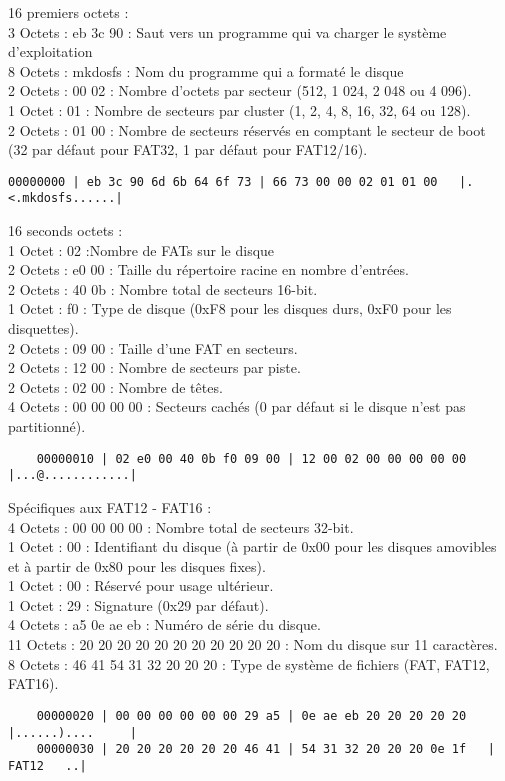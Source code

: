 \documentclass[11pt]{report}
\begin{document}
16 premiers octets : \\
3 Octets : eb 3c 90 : Saut vers un programme qui va charger le système d'exploitation \\
8 Octets : mkdosfs : Nom du programme qui a formaté le disque\\
2 Octets : 00 02 : Nombre d'octets par secteur (512, 1 024, 2 048 ou 4 096). \\
1 Octet : 01 : Nombre de secteurs par cluster (1, 2, 4, 8, 16, 32, 64 ou 128).\\
2 Octets : 01 00 : Nombre de secteurs réservés en comptant le secteur de boot\\
(32 par défaut pour FAT32, 1 par défaut pour FAT12/16).
\begin{verbatim}
00000000 | eb 3c 90 6d 6b 64 6f 73 | 66 73 00 00 02 01 01 00   |.<.mkdosfs......| 
\end{verbatim}

16 seconds octets :\\
1 Octet : 02 :Nombre de FATs sur le disque\\
2 Octets : e0 00 : Taille du répertoire racine en nombre d'entrées.\\
2 Octets : 40 0b : Nombre total de secteurs 16-bit.\\
1 Octet : f0 : Type de disque (0xF8 pour les disques durs, 0xF0 pour les disquettes).\\
2 Octets : 09 00 : Taille d'une FAT en secteurs.\\
2 Octets : 12 00 : Nombre de secteurs par piste.\\
2 Octets : 02 00 : Nombre de têtes.\\
4 Octets : 00 00 00 00 : Secteurs cachés (0 par défaut si le disque n'est pas partitionné).
\begin{verbatim}
	00000010 | 02 e0 00 40 0b f0 09 00 | 12 00 02 00 00 00 00 00   |...@............| 
\end{verbatim}

Spécifiques aux FAT12 - FAT16 : \\
4 Octets : 00 00 00 00 : Nombre total de secteurs 32-bit.\\
1 Octet : 00 : Identifiant du disque (à partir de 0x00 pour les disques amovibles et à partir de 0x80 pour les disques fixes).\\
1 Octet : 00 : Réservé pour usage ultérieur.\\
1 Octet : 29 : Signature (0x29 par défaut).\\
4 Octets : a5 0e ae eb : Numéro de série du disque.\\
11 Octets : 20 20 20 20 20 20 20 20 20 20 20 : Nom du disque sur 11 caractères.\\
8 Octets : 46 41 54 31 32 20 20 20 : Type de système de fichiers (FAT, FAT12, FAT16).
\begin{verbatim}
	00000020 | 00 00 00 00 00 00 29 a5 | 0e ae eb 20 20 20 20 20   |......)....     | 
	00000030 | 20 20 20 20 20 20 46 41 | 54 31 32 20 20 20 0e 1f   |      FAT12   ..| 
\end{verbatim}
\newpage
\end{document}
